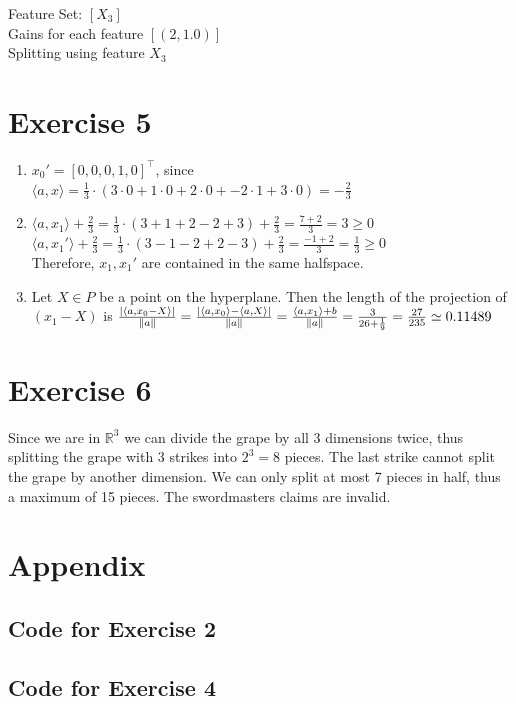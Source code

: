 \documentclass[12pt]{article}
\DeclarePairedDelimiter\abs{\lvert}{\rvert}
\DeclarePairedDelimiter\Abs{\lVert}{\rVert}
\begin{document}
Feature Set: $[X_3]$ \\
Gains for each feature $[(2, 1.0)]$ \\
Splitting using feature $X_3$ \\

\section*{Exercise 5}
\begin{enumerate}[label=(\alph*)]
	\item	$x_0' = [0, 0, 0, 1, 0]^\top$, since $\langle a,x \rangle = \frac{1}{3} \cdot (3 \cdot 0 + 1 \cdot 0 + 2 \cdot 0 + -2 \cdot 1 + 3 \cdot 0) = -\frac{2}{3}$
	\item	$\langle a,x_1 \rangle + \frac{2}{3} = \frac{1}{3} \cdot (3+1+2-2+3) + \frac{2}{3} = \frac{7+2}{3} = 3 \geq 0$ \\
			$\langle a,x_1' \rangle + \frac{2}{3} = \frac{1}{3} \cdot (3-1-2+2-3) + \frac{2}{3} = \frac{-1+2}{3} = \frac{1}{3} \geq 0$ \\
			Therefore, $x_1,x_1'$ are contained in the same halfspace.
	\item	Let $X \in P$ be a point on the hyperplane. Then the length of the projection of $(x_1 - X)$ is $\frac{\abs{\langle a,x_0 - X \rangle}}{\Abs{a}} = \frac{\abs{\langle a,x_0 \rangle - \langle a,X \rangle}}{\Abs{a}} = \frac{\langle a,x_1 \rangle + b}{\Abs{a}} = \frac{3}{26 + \frac{1}{9}} = \frac{27}{235} \simeq 0.11489$
\end{enumerate}

\section*{Exercise 6}
Since we are in $\mathbb{R}^3$ we can divide the grape by all 3 dimensions twice, thus splitting the grape with 3 strikes into $2^3=8$ pieces. The last strike cannot split the grape by another dimension. We can only split at most 7 pieces in half, thus a maximum of 15 pieces. The swordmasters claims are invalid.

\section*{Appendix}\label{appendix}
\subsection*{Code for Exercise 2}


\subsection*{Code for Exercise 4}

\end{document}
